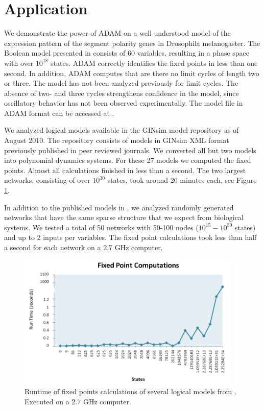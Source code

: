 \documentclass[11pt]{amsart}
\begin{document}
\section{Application} \label{benchmarks}
We demonstrate the power of ADAM on a well understood model of the expression
pattern of the segment polarity genes in Drosophila melanogaster.  The Boolean
model presented in \cite{AO} consists of 60 variables, resulting in a phase
space with over $10^{18}$ states. ADAM correctly identifies the fixed points
in less than one second. In addition, ADAM computes that are there no limit
cycles of length two or three. The model has not been analyzed previously for
limit cycles. The absence of two- and three cycles strengthens confidence in
the model, since oscillatory behavior has not been observed experimentally.
The model file in ADAM format can be accessed at \cite{DrosophilaModel}. 

We analyzed logical models
available in the GINsim model repository \cite{GINsimRepo} as of August 2010. The
repository consists of models in GINsim XML format previously published in
peer reviewed journals. We converted all but two models into polynomial
dynamics systems. For these 27 models we computed the fixed points. Almost all
calculations finished in less than a second. The two largest networks,
consisting of over $10^{30}$ states, took around 20 minutes each, see 
Figure \ref{fig:chart}. 

In addition to the published models in \cite{GINsimRepo}, we analyzed 
randomly generated networks
that have the same sparse structure that we
expect from biological systems. We tested a total of 50 networks with
50-100 nodes ($10^{15} - 10^{30}$ states) and up to 2 inputs per variables. The 
fixed point calculations took less than half a second for each network on
a 2.7 GHz computer. 


\begin{figure}[htb]
  \centering
  \includegraphics[width=0.95\textwidth]{GINSimChart.png}
  \caption{Runtime of fixed points calculations of several logical models from
  \cite{GINsimRepo}. Executed on a 2.7 GHz computer.}
  \label{fig:chart}
\end{figure}
\end{document}
